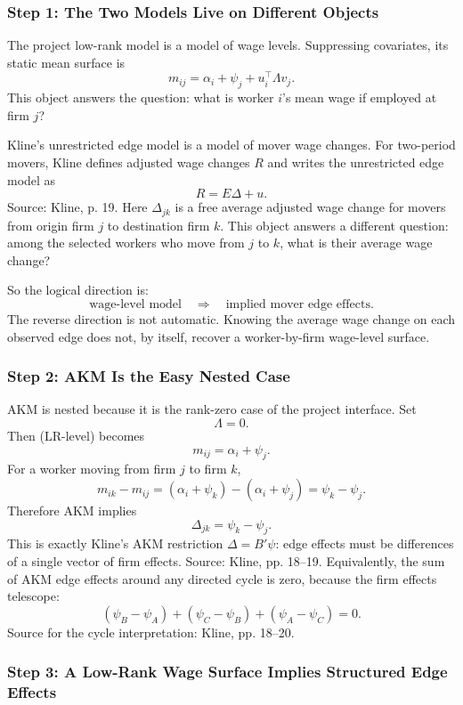 ﻿\documentclass[11pt]{article}
\newcommand{\1}{\mathbf{1}}
\begin{document}
\subsubsection{Step 1: The Two Models Live on Different Objects}

The project low-rank model is a model of wage levels. Suppressing covariates, its
static mean surface is
\[
m_{ij}
=
\alpha_i+\psi_j+u_i^\top\Lambda v_j.
\tag{LR-level}
\]
This object answers the question: what is worker $i$'s mean wage if employed at
firm $j$?

Kline's unrestricted edge model is a model of mover wage changes. For two-period
movers, Kline defines adjusted wage changes $R$ and writes the unrestricted edge
model as
\[
R=E\Delta+u.
\tag{Kline-edge}
\]
Source: Kline, p. 19. Here $\Delta_{jk}$ is a free average adjusted wage change
for movers from origin firm $j$ to destination firm $k$. This object answers a
different question: among the selected workers who move from $j$ to $k$, what is
their average wage change?

So the logical direction is:
\[
\text{wage-level model}
\quad\Longrightarrow\quad
\text{implied mover edge effects}.
\]
The reverse direction is not automatic. Knowing the average wage change on each
observed edge does not, by itself, recover a worker-by-firm wage-level surface.

\subsubsection{Step 2: AKM Is the Easy Nested Case}

AKM is nested because it is the rank-zero case of the project interface. Set
\[
\Lambda=0.
\]
Then (LR-level) becomes
\[
m_{ij}=\alpha_i+\psi_j.
\tag{AKM-level}
\]
For a worker moving from firm $j$ to firm $k$,
\[
m_{ik}-m_{ij}
=
(\alpha_i+\psi_k)-(\alpha_i+\psi_j)
=
\psi_k-\psi_j.
\]
Therefore AKM implies
\[
\Delta_{jk}=\psi_k-\psi_j.
\tag{AKM-edge}
\]
This is exactly Kline's AKM restriction $\Delta=B'\psi$: edge effects must be
differences of a single vector of firm effects. Source: Kline, pp. 18--19.
Equivalently, the sum of AKM edge effects around any directed cycle is zero,
because the firm effects telescope:
\[
(\psi_B-\psi_A)+(\psi_C-\psi_B)+(\psi_A-\psi_C)=0.
\]
Source for the cycle interpretation: Kline, pp. 18--20.

\subsubsection{Step 3: A Low-Rank Wage Surface Implies Structured Edge Effects}
\end{document}

